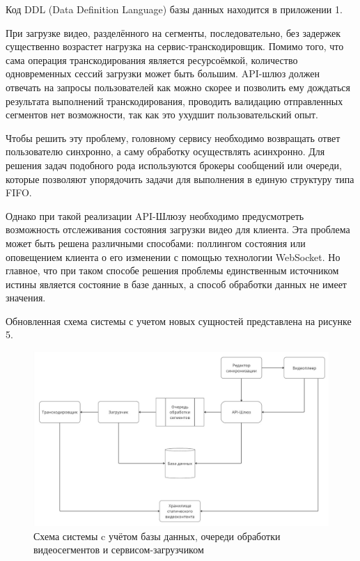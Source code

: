 	Код DDL (Data Definition Language) базы данных находится в приложении 1.

	При загрузке видео, разделённого на сегменты, последовательно, без задержек существенно возрастет нагрузка на сервис-транскодировщик. Помимо того, что сама операция транскодирования является ресурсоёмкой, количество одновременных сессий загрузки может быть большим. API-шлюз должен отвечать на запросы пользователей как можно скорее и позволить ему дождаться результата выполнений транскодирования, проводить валидацию отправленных сегментов нет возможности, так как это ухудшит пользовательский опыт.

	Чтобы решить эту проблему, головному сервису необходимо возвращать ответ пользователю синхронно, а саму обработку осуществлять асинхронно. Для решения задач подобного рода используются брокеры сообщений или очереди, которые позволяют упорядочить задачи для выполнения в единую структуру типа FIFO.

	Однако при такой реализации API-Шлюзу необходимо предусмотреть возможность отслеживания состояния загрузки видео для клиента. Эта проблема может быть решена различными способами: поллингом состояния или оповещением клиента о его изменении с помощью технологии WebSocket. Но главное, что при таком способе решения проблемы единственным источником истины является состояние в базе данных, а способ обработки данных не имеет значения.

	Обновленная схема системы с учетом новых сущностей представлена на рисунке 5.

	\begin{figure}[ht!] 
		\center
		\includegraphics [scale=0.33] {my_folder/images//system_scheme_4}
		\caption{Схема системы c учётом базы данных, очереди обработки видеосегментов и сервисом-загрузчиком} 
		\label{fig:system_scheme_4}  
	\end{figure}

